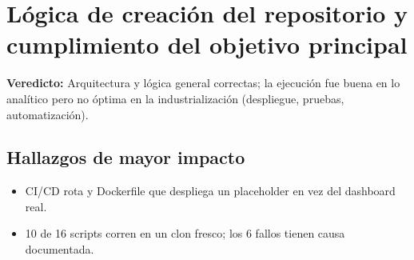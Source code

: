 \section{Lógica de creación del repositorio y cumplimiento del objetivo principal}

\begin{tcolorbox}[hallazgo]
\textbf{Veredicto:} Arquitectura y lógica general correctas; la ejecución fue buena en lo analítico pero no óptima en la industrialización (despliegue, pruebas, automatización).

\end{tcolorbox}

\subsection{Hallazgos de mayor impacto}

\begin{itemize}
  \item CI/CD rota y Dockerfile que despliega un placeholder en vez del dashboard real.
  \item 10 de 16 scripts corren en un clon fresco; los 6 fallos tienen causa documentada.
\end{itemize}
